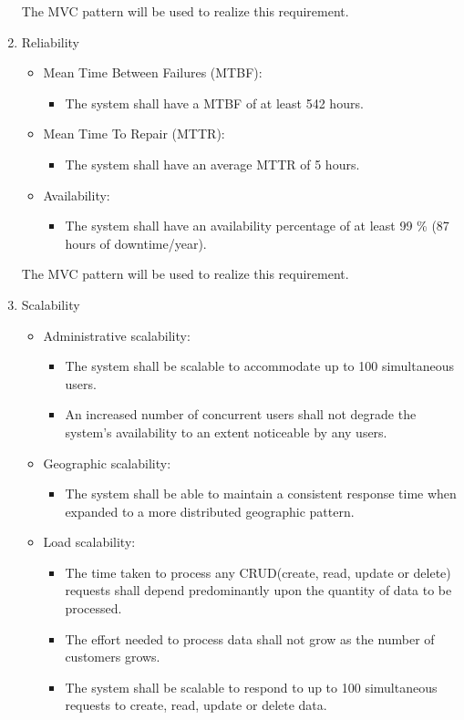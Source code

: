 \documentclass{article}
\begin{document}
\begin{enumerate}
		The MVC pattern will be used to realize this requirement.

		\item{Reliability}
		\begin{itemize}
		 \item Mean Time Between Failures (MTBF):
		 		\begin{itemize}
		 			\item The system shall have a MTBF of at least 542 hours.
				\end{itemize}
		 \item Mean Time To Repair (MTTR):
		 		\begin{itemize}
		 			\item The system shall have an average MTTR of 5 hours.		
				\end{itemize}
		 \item Availability:
		 		\begin{itemize}
		 			\item The system shall have an availability percentage of at least 99 \%  (87 hours of downtime/year).
				\end{itemize}
		\end{itemize}
		
		The MVC pattern will be used to realize this requirement.

		\item{Scalability}
		\begin{itemize}
		 \item Administrative scalability:
		 		\begin{itemize}
		 			\item The system shall be scalable to accommodate up to 100 simultaneous users.
					\item An increased number of concurrent users shall not degrade the system's availability to an extent noticeable by any users.
				\end{itemize}
		 \item Geographic scalability:
		 		\begin{itemize}
		 			\item The system shall be able to maintain a consistent response time when expanded to a more distributed geographic pattern. 
				\end{itemize}
		 \item Load scalability:
		 		\begin{itemize}
		 			\item The time taken to process any CRUD(create, read, update or delete) requests shall depend predominantly upon the quantity of data to be processed. 
		 			\item The effort needed to process data shall not grow as the number of customers grows.
					\item The system shall be scalable to respond to up to 100 simultaneous requests to create, read, update or delete data.	
				\end{itemize}	
		\end{itemize}
		

\end{enumerate}
\end{document}
